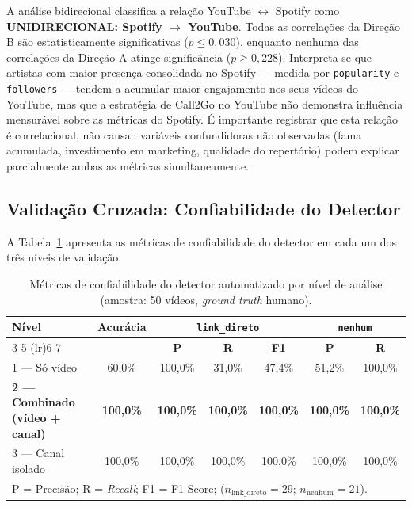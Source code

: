 \documentclass[12pt, a4paper]{article}
\begin{document}
A análise bidirecional classifica a relação YouTube $\leftrightarrow$ Spotify como \textbf{UNIDIRECIONAL: Spotify $\to$ YouTube}. Todas as correlações da Direção B são estatisticamente significativas ($p \leq 0{,}030$), enquanto nenhuma das correlações da Direção A atinge significância ($p \geq 0{,}228$). Interpreta-se que artistas com maior presença consolidada no Spotify --- medida por \texttt{popularity} e \texttt{followers} --- tendem a acumular maior engajamento nos seus vídeos do YouTube, mas que a estratégia de Call2Go no YouTube não demonstra influência mensurável sobre as métricas do Spotify. É importante registrar que esta relação é correlacional, não causal: variáveis confundidoras não observadas (fama acumulada, investimento em marketing, qualidade do repertório) podem explicar parcialmente ambas as métricas simultaneamente.

\subsection{Validação Cruzada: Confiabilidade do Detector}

A Tabela~\ref{tab:crossval} apresenta as métricas de confiabilidade do detector em cada um dos três níveis de validação.

\begin{table}[H]
\centering
\caption{Métricas de confiabilidade do detector automatizado por nível de análise (amostra: 50 vídeos, \textit{ground truth} humano).}
\label{tab:crossval}
\renewcommand{\arraystretch}{1.3}
\begin{tabular}{@{}lcccccc@{}}
\toprule
\multirow{2}{*}{\textbf{Nível}} & \multirow{2}{*}{\textbf{Acurácia}} & \multicolumn{3}{c}{\textbf{\texttt{link\_direto}}} & \multicolumn{2}{c}{\textbf{\texttt{nenhum}}} \\
\cmidrule(lr){3-5} \cmidrule(lr){6-7}
 & & \textbf{P} & \textbf{R} & \textbf{F1} & \textbf{P} & \textbf{R} \\
\midrule
1 --- Só vídeo & 60,0\% & 100,0\% & 31,0\% & 47,4\% & 51,2\% & 100,0\% \\
\textbf{2 --- Combinado (vídeo + canal)} & \textbf{100,0\%} & \textbf{100,0\%} & \textbf{100,0\%} & \textbf{100,0\%} & \textbf{100,0\%} & \textbf{100,0\%} \\
3 --- Canal isolado & 100,0\% & 100,0\% & 100,0\% & 100,0\% & 100,0\% & 100,0\% \\
\bottomrule
\multicolumn{7}{l}{\footnotesize P = Precisão; R = \textit{Recall}; F1 = F1-Score; ($n_{\text{link\_direto}} = 29$; $n_{\text{nenhum}} = 21$).}
\end{tabular}
\end{table}
\end{document}
